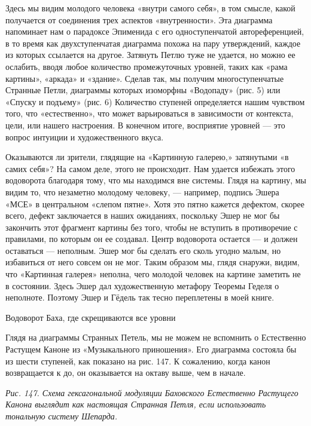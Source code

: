 Здесь мы видим молодого человека «внутри самого себя», в том смысле, какой получается от соединения трех аспектов «внутренности». Эта диаграмма напоминает нам о парадоксе Эпименида с его одноступенчатой автореференцией, в то время как двухступенчатая диаграмма похожа на пару утверждений, каждое из которых ссылается на другое. Затянуть Петлю туже не удается, но можно ее ослабить, вводя любое количество промежуточных уровней, таких как «рама картины», «аркада» и «здание». Сделав так, мы получим многоступенчатые Странные Петли, диаграммы которых изоморфны «Водопаду» (рис. 5) или «Спуску и подъему» (рис. 6) Количество ступеней определяется нашим чувством того, что «естественно», что может варьироваться в зависимости от контекста, цели, или нашего настроения. В конечном итоге, восприятие уровней --- это вопрос интуиции и художественного вкуса.

Оказываются ли зрители, глядящие на «Картинную галерею,» затянутыми «в самих себя»? На самом деле, этого не происходит. Нам удается избежать этого водоворота благодаря тому, что мы находимся вне системы. Глядя на картину, мы видим то, что незаметно молодому человеку, --- например, подпись Эшера «МСЕ» в центральном «слепом пятне». Хотя это пятно кажется дефектом, скорее всего, дефект заключается в наших ожиданиях, поскольку Эшер не мог бы закончить этот фрагмент картины без того, чтобы не вступить в противоречие с правилами, по которым он ее создавал. Центр водоворота остается --- и должен оставаться --- неполным. Эшер мог бы сделать его сколь угодно малым, но избавиться от него совсем он не мог. Таким образом мы, глядя снаружи, видим, что «Картинная галерея» неполна, чего молодой человек на картине заметить не в состоянии. Здесь Эшер дал художественную метафору Теоремы Геделя о неполноте. Поэтому Эшер и Гёдель так тесно переплетены в моей книге.

Водоворот Баха, где скрещиваются все уровни

Глядя на диаграммы Странных Петель, мы не можем не вспомнить о Естественно Растущем Каноне из «Музыкального приношения». Его диаграмма состояла бы из шести ступеней, как показано на рис. 147. К сожалению, когда канон возвращается к до, он оказывается на октаву выше, чем в начале.

\emph{Рис. 147. Схема гексагональной модуляции Баховского Естественно Растущего Канона выглядит как настоящая Странная Петля, если использовать тональную систему Шепарда.}

